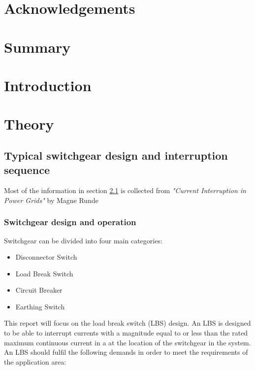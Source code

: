 \documentclass[10pt,b5paper,twoside]{article}
\begin{document}
\thispagestyle{empty}
\cleardoublepage
\section*{Acknowledgements}
\setcounter{page}{1}

\cleardoublepage
\section*{Summary}

\cleardoublepage
\setcounter{page}{1}
\tableofcontents
\cleardoublepage

\section{Introduction}

\cleardoublepage

\section{Theory}
\subsection{Typical switchgear design and interruption sequence} \label{sec:genDes}
Most of the information in section \ref{sec:genDes} is collected from \textit{"Current Interruption in Power Grids"} by Magne Runde \cite{bib:HVEbreak} \newline

\subsubsection{Switchgear design and operation} \label{sec:InterruptCurrent}
Switchgear can be divided into four main categories:
\begin{itemize}
\item Disconnector Switch
\item Load Break Switch
\item Circuit Breaker
\item Earthing Switch
\end{itemize}

This report will focus on the load break switch (LBS) design. An LBS is designed to be able to interrupt currents with a magnitude equal to or less than the rated maximum continuous current in a at the location of the switchgear in the system. An LBS should fulfil the following demands in order to meet the requirements of the application area:
\end{document}
